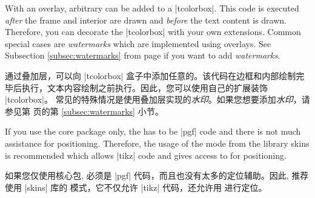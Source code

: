 
With an overlay, arbitrary  can be added to a
 |tcolorbox|. This code is executed \emph{after} the frame and interior are
 drawn and \emph{before} the text content is drawn. Therefore, you can
 decorate the |tcolorbox| with your own extensions.
 Common special cases are \emph{watermarks} which are implemented using overlays.
 See Subsection \ref{subsec:watermarks} from page \pageref{subsec:watermarks} if
 you want to add \emph{watermarks}.

通过叠加层，可以向 |tcolorbox| 盒子中添加任意的。该代码在边框和内部绘制完毕后执行，文本内容绘制之前执行。因此，您可以使用自己的扩展装饰 |tcolorbox|。
常见的特殊情况是使用叠加层实现的\emph{水印}。如果您想要添加\emph{水印}，请参见第 \pageref{subsec:watermarks} 页的第 \ref{subsec:watermarks} 小节。


\begin{marker}
 If you use the core package only, the  has to be |pgf| code
 and there is not much assistance for positioning.
 Therefore, the usage of the  mode from the library skins
 is recommended which allows |tikz| code and gives access to
  for positioning.

如果您仅使用核心包,  必须是 |pgf| 代码，而且也没有太多的定位辅助。因此, 推荐使用 |skins| 库的  模式，它不仅允许 |tikz| 代码，还允许用  进行定位。
\end{marker}